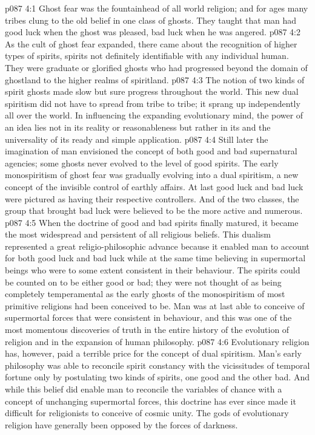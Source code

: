 \vs p087 4:1 Ghost fear was the fountainhead of all world religion; and for ages many tribes clung to the old belief in one class of ghosts. They taught that man had good luck when the ghost was pleased, bad luck when he was angered.
\vs p087 4:2 As the cult of ghost fear expanded, there came about the recognition of higher types of spirits, spirits not definitely identifiable with any individual human. They were graduate or glorified ghosts who had progressed beyond the domain of ghostland to the higher realms of spiritland.
\vs p087 4:3 The notion of two kinds of spirit ghosts made slow but sure progress throughout the world. This new dual spiritism did not have to spread from tribe to tribe; it sprang up independently all over the world. In influencing the expanding evolutionary mind, the power of an idea lies not in its reality or reasonableness but rather in its  and the universality of its ready and simple application.
\vs p087 4:4 Still later the imagination of man envisioned the concept of both good and bad supernatural agencies; some ghosts never evolved to the level of good spirits. The early monospiritism of ghost fear was gradually evolving into a dual spiritism, a new concept of the invisible control of earthly affairs. At last good luck and bad luck were pictured as having their respective controllers. And of the two classes, the group that brought bad luck were believed to be the more active and numerous.
\vs p087 4:5 \pc When the doctrine of good and bad spirits finally matured, it became the most widespread and persistent of all religious beliefs. This dualism represented a great religio\hyp{}philosophic advance because it enabled man to account for both good luck and bad luck while at the same time believing in supermortal beings who were to some extent consistent in their behaviour. The spirits could be counted on to be either good or bad; they were not thought of as being completely temperamental as the early ghosts of the monospiritism of most primitive religions had been conceived to be. Man was at last able to conceive of supermortal forces that were consistent in behaviour, and this was one of the most momentous discoveries of truth in the entire history of the evolution of religion and in the expansion of human philosophy.
\vs p087 4:6 Evolutionary religion has, however, paid a terrible price for the concept of dual spiritism. Man’s early philosophy was able to reconcile spirit constancy with the vicissitudes of temporal fortune only by postulating two kinds of spirits, one good and the other bad. And while this belief did enable man to reconcile the variables of chance with a concept of unchanging supermortal forces, this doctrine has ever since made it difficult for religionists to conceive of cosmic unity. The gods of evolutionary religion have generally been opposed by the forces of darkness.
